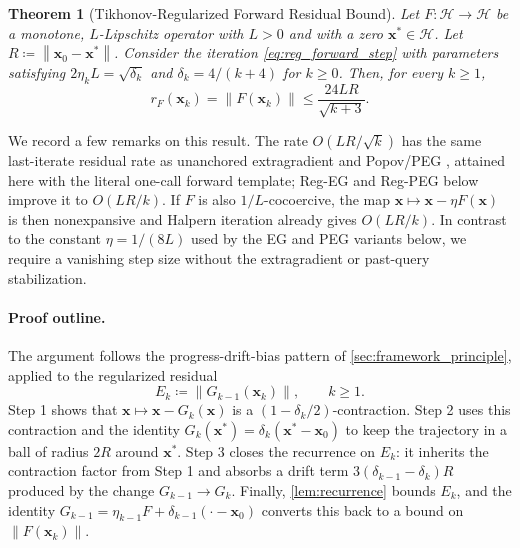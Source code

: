 \documentclass[letterpaper,11pt]{article}
\newcommand{\norm}[1]{\left\| #1 \right\|}
\newcommand{\vect}[1]{\mathbf{#1}}
\newtheorem{theorem}{Theorem}
\begin{document}

\begin{theorem}[Tikhonov-Regularized Forward Residual Bound]\label{thm:reg_forward}
Let \(F:\mathcal H\to\mathcal H\) be a monotone, \(L\)-Lipschitz operator with
\(L>0\) and with a zero \(\vect{x}^*\in\mathcal H\). Let
\(R\coloneqq\norm{\vect{x}_0-\vect{x}^*}\). Consider the iteration
\eqref{eq:reg_forward_step} with parameters satisfying
\(2\eta_kL=\sqrt{\delta_k}\) and \(\delta_k=4/(k+4)\) for \(k\ge0\). Then, for
every \(k\ge1\),
\[
    r_F(\vect{x}_k)
    =
    \norm{F(\vect{x}_k)}
    \le
    \frac{24LR}{\sqrt{k+3}}.
\]
\end{theorem}

We record a few remarks on this result.
The rate \(O(LR/\sqrt{k})\) has the same
last-iterate residual rate as unanchored extragradient and Popov/PEG
\cite{gorbunov2022extragradient,gorbunov2022last}, attained here with the
literal one-call forward template; Reg-EG and Reg-PEG below improve it to
\(O(LR/k)\). If \(F\) is also \(1/L\)-cocoercive, the map
\(\vect{x}\mapsto\vect{x}-\eta F(\vect{x})\) is then nonexpansive and Halpern
iteration already gives \(O(LR/k)\).
In contrast to the constant \(\eta=1/(8L)\) used by
the EG and PEG variants below, we require a vanishing step size
without the extragradient or past-query stabilization.

\paragraph{Proof outline.}
The argument follows the progress-drift-bias pattern of
\cref{sec:framework_principle}, applied to the regularized residual
\[
    E_k\coloneqq\norm{G_{k-1}(\vect{x}_k)},\qquad k\ge1.
\]
Step 1 shows that \(\vect{x}\mapsto\vect{x}-G_k(\vect{x})\) is a
\((1-\delta_k/2)\)-contraction. Step 2 uses this contraction and the identity
\(G_k(\vect{x}^*)=\delta_k(\vect{x}^*-\vect{x}_0)\) to keep the trajectory in a
ball of radius \(2R\) around \(\vect{x}^*\). Step 3 closes the recurrence on
\(E_k\): it inherits the contraction factor from Step 1 and absorbs a drift
term \(3(\delta_{k-1}-\delta_k)R\) produced by the change
\(G_{k-1}\to G_k\). Finally, \cref{lem:recurrence} bounds \(E_k\), and the
identity \(G_{k-1}=\eta_{k-1}F+\delta_{k-1}(\cdot-\vect{x}_0)\) converts this
back to a bound on \(\norm{F(\vect{x}_k)}\).
\end{document}
